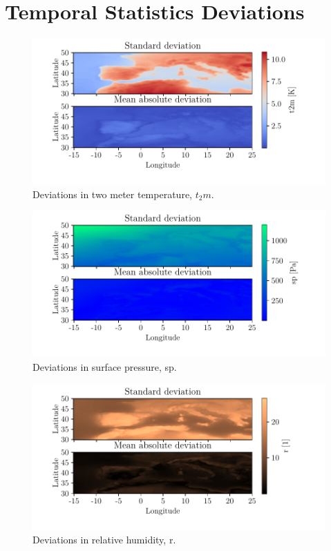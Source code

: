 \section{Temporal Statistics Deviations} \label{sec:all_stats_deviation}
\begin{figure}[ht]
    \centering
    \includegraphics{python_figs/DEVIATION_all_stat_variable_t2m.pdf}
    \caption{Deviations in two meter temperature, $t_2m$.}
    \label{fig:deviation_t2m}
\end{figure}
\begin{figure}[ht]
    \centering
    \includegraphics{python_figs/DEVIATION_all_stat_variable_sp.pdf}
    \caption{Deviations in surface pressure, sp.}
    \label{fig:deviation_sp}
\end{figure}
\begin{figure}[ht]
    \centering
    \includegraphics{python_figs/DEVIATION_all_stat_variable_r.pdf}
    \caption{Deviations in relative humidity, r.}
    \label{fig:deviation_r}
\end{figure}
